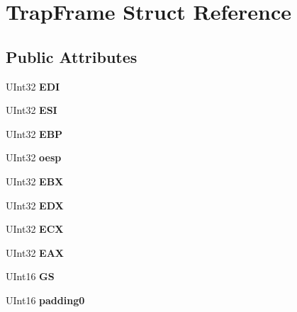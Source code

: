 \hypertarget{struct_trap_frame}{}\section{Trap\+Frame Struct Reference}
\label{struct_trap_frame}
\subsection*{Public Attributes}
\begin{DoxyCompactItemize}
\item 
\mbox{\label{struct_trap_frame_ac03f50b2a32193a8e7865027bd11a817}} 
U\+Int32 {\bfseries E\+DI}
\item 
\mbox{\label{struct_trap_frame_ab16b6a9b969d4888cdbc4ed8ab89b217}} 
U\+Int32 {\bfseries E\+SI}
\item 
\mbox{\label{struct_trap_frame_aba8f7d42a08fe684c519c4032ebfc8ae}} 
U\+Int32 {\bfseries E\+BP}
\item 
\mbox{\label{struct_trap_frame_add2131c511d723c1553771fff486164d}} 
U\+Int32 {\bfseries oesp}
\item 
\mbox{\label{struct_trap_frame_afae131184121b1628d0a51eaaff23a94}} 
U\+Int32 {\bfseries E\+BX}
\item 
\mbox{\label{struct_trap_frame_aec7d73867f1f3561737f1fde792078dc}} 
U\+Int32 {\bfseries E\+DX}
\item 
\mbox{\label{struct_trap_frame_ac0e8b392fb289a8f2bcd8a7f51c7e453}} 
U\+Int32 {\bfseries E\+CX}
\item 
\mbox{\label{struct_trap_frame_ab0948d1f208ddf81b4081e95a2649139}} 
U\+Int32 {\bfseries E\+AX}
\item 
\mbox{\label{struct_trap_frame_ad2866757f80530653bb399375cb33c47}} 
U\+Int16 {\bfseries GS}
\item 
\mbox{\label{struct_trap_frame_a9d181b0f4e8b1d4edf768c8d3fa7e8bd}} 
U\+Int16 {\bfseries padding0}

\end{DoxyCompactItemize}
